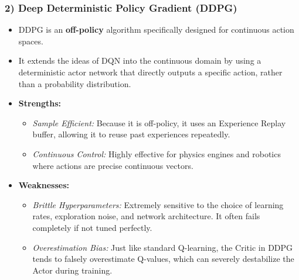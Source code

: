 \documentclass[12pt]{article}
\begin{document}
\subsubsection*{2) Deep Deterministic Policy Gradient (DDPG)}
\begin{itemize}[label=$\bullet$]
    \item DDPG is an \textbf{off-policy} algorithm specifically designed for continuous action spaces.
    \item It extends the ideas of DQN into the continuous domain by using a deterministic actor network that directly outputs a specific action, rather than a probability distribution.
    \item \textbf{Strengths:}
    \begin{itemize}[label=$\circ$]
        \item \textit{Sample Efficient:} Because it is off-policy, it uses an Experience Replay buffer, allowing it to reuse past experiences repeatedly.
        \item \textit{Continuous Control:} Highly effective for physics engines and robotics where actions are precise continuous vectors.
    \end{itemize}
    \item \textbf{Weaknesses:}
    \begin{itemize}[label=$\circ$]
        \item \textit{Brittle Hyperparameters:} Extremely sensitive to the choice of learning rates, exploration noise, and network architecture. It often fails completely if not tuned perfectly.
        \item \textit{Overestimation Bias:} Just like standard Q-learning, the Critic in DDPG tends to falsely overestimate Q-values, which can severely destabilize the Actor during training.
    \end{itemize}
\end{itemize}
\end{document}
